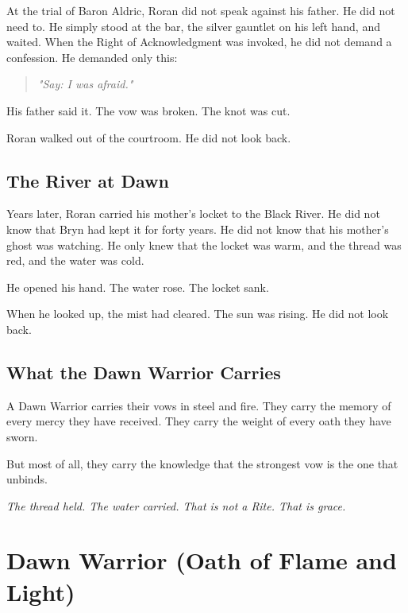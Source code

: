 At the trial of Baron Aldric, Roran did not speak against his father. He did not need to. He simply stood at the bar, the silver gauntlet on his left hand, and waited. When the Right of Acknowledgment was invoked, he did not demand a confession. He demanded only this:

\vspace{0.5em}
\begin{quote}
\textit{"Say: I was afraid."}
\end{quote}
\vspace{0.5em}

His father said it. The vow was broken. The knot was cut.

Roran walked out of the courtroom. He did not look back.

\subsection{The River at Dawn}

Years later, Roran carried his mother's locket to the Black River. He did not know that Bryn had kept it for forty years. He did not know that his mother's ghost was watching. He only knew that the locket was warm, and the thread was red, and the water was cold.

He opened his hand. The water rose. The locket sank.

When he looked up, the mist had cleared. The sun was rising. He did not look back.

\subsection{What the Dawn Warrior Carries}

A Dawn Warrior carries their vows in steel and fire. They carry the memory of every mercy they have received. They carry the weight of every oath they have sworn.

But most of all, they carry the knowledge that the strongest vow is the one that unbinds.

\vspace{1em}
\begin{center}
\textit{The thread held. The water carried. That is not a Rite. That is grace.}
\end{center}

\section{Dawn Warrior (Oath of Flame and Light)}

